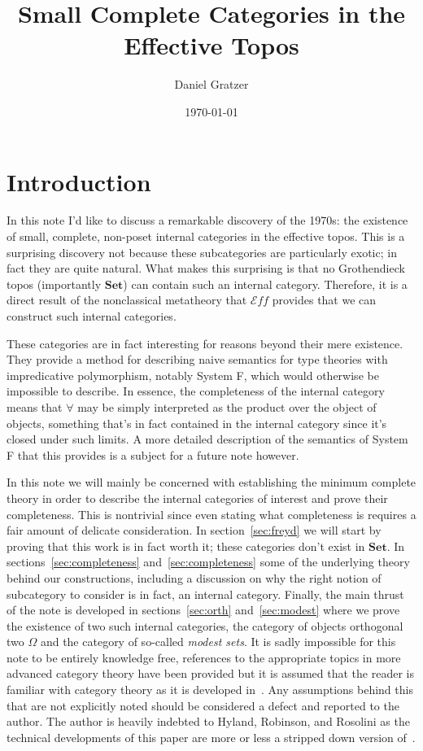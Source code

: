 \documentclass[12pt]{amsart}
\title{Small Complete Categories in the Effective Topos}
\author{Daniel Gratzer}
\date{\today}
\newcommand{\cat}[1]{\ensuremath{\mathbf{#1}}}
\newcommand{\set}{\cat{Set}}
\newcommand{\eff}{\mathcal{E}\!f\!f}
\begin{document}
\maketitle

\section{Introduction}\label{sec:introduction}

In this note I'd like to discuss a remarkable discovery of the 1970s:
the existence of small, complete, non-poset internal categories in the
effective topos. This is a surprising discovery not because these
subcategories are particularly exotic; in fact they are quite
natural. What makes this surprising is that no Grothendieck topos
(importantly $\set$) can contain such an internal category. Therefore,
it is a direct result of the nonclassical metatheory that $\eff$
provides that we can construct such internal categories.

These categories are in fact interesting for reasons beyond their mere
existence. They provide a method for describing naive semantics for
type theories with impredicative polymorphism, notably System F, which
would otherwise be impossible to describe. In essence, the
completeness of the internal category means that $\forall$ may be
simply interpreted as the product over the object of objects,
something that's in fact contained in the internal category since it's
closed under such limits. A more detailed description of the semantics
of System F that this provides is a subject for a future note however.

In this note we will mainly be concerned with establishing the minimum
complete theory in order to describe the internal categories of
interest and prove their completeness. This is nontrivial since even
stating what completeness is requires a fair amount of delicate
consideration. In section~\ref{sec:freyd} we will start by proving
that this work is in fact worth it; these categories don't exist in
$\set$. In sections~\ref{sec:completeness} and~\ref{sec:completeness}
some of the underlying theory behind our constructions, including a
discussion on why the right notion of subcategory to consider is in
fact, an internal category. Finally, the main thrust of the note is
developed in sections~\ref{sec:orth} and~\ref{sec:modest} where we
prove the existence of two such internal categories, the category of
objects orthogonal two $\Omega$ and the category of so-called
\emph{modest sets}. It is sadly impossible for this note to be
entirely knowledge free, references to the appropriate topics in more
advanced category theory have been provided but it is assumed that the
reader is familiar with category theory as it is developed
in~\citet{MacLane:98}. Any assumptions behind this that are not
explicitly noted should be considered a defect and reported to the
author. The author is heavily indebted to Hyland, Robinson, and
Rosolini as the technical developments of this paper are more or less
a stripped down version of~\citet{Hyland:90}.
\end{document}
